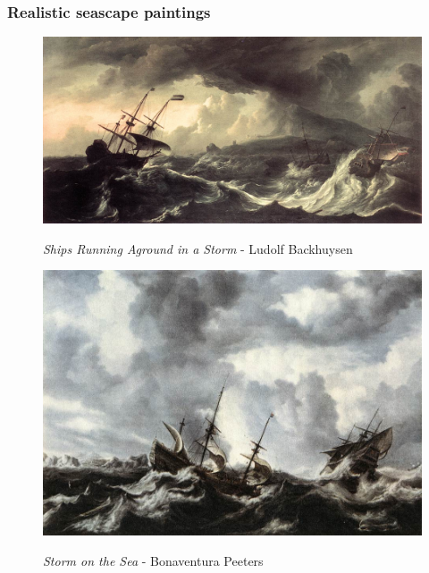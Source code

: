 \documentclass[a4paper]{article}
\begin{document}
\subsubsection{Realistic seascape paintings}
\begin {figure}[h!]
\centering
\begin{minipage}[b]{.49\textwidth}
	\centering
	\includegraphics[width=\textwidth]{SeaPaintings/R1backhuysenshipsrunningagroundinastorm.jpg}
    \caption{\emph{Ships Running Aground in a Storm} - Ludolf Backhuysen}
\end{minipage}
\hfill
\begin{minipage}[b]{.49\textwidth}
	\centering
	\includegraphics[width=\textwidth]{SeaPaintings/R2peetersstormonthesea.jpg}
    \caption{\emph{Storm on the Sea} - Bonaventura Peeters}
\end{minipage}
\end{figure}
\end{document}
